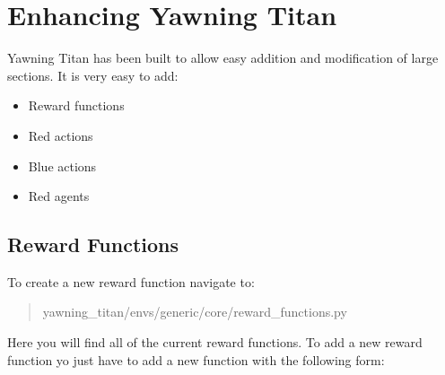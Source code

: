 \documentclass[letterpaper,10pt,english]{sphinxmanual}
\begin{document}
\chapter{Enhancing Yawning Titan}
\label{\detokenize{source/enhancing_yawning_titan:enhancing-yawning-titan}}\label{\detokenize{source/enhancing_yawning_titan::doc}}
\sphinxAtStartPar
Yawning Titan has been built to allow easy addition and modification
of large sections. It is very easy to add:
\begin{itemize}
\item {}
\sphinxAtStartPar
Reward functions

\item {}
\sphinxAtStartPar
Red actions

\item {}
\sphinxAtStartPar
Blue actions

\item {}
\sphinxAtStartPar
Red agents

\end{itemize}


\section{Reward Functions}
\label{\detokenize{source/enhancing_yawning_titan:reward-functions}}
\sphinxAtStartPar
To create a new reward function navigate to:
\begin{quote}

\sphinxAtStartPar
yawning\_titan/envs/generic/core/reward\_functions.py
\end{quote}

\sphinxAtStartPar
Here you will find all of the current reward functions. To add a new
reward function yo just have to add a new function with the following
form:

\begin{sphinxVerbatim}[commandchars=\\\{\}]
    
\end{sphinxVerbatim}
\end{document}
